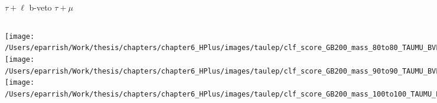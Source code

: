 \documentclass[aspectratio=169,xcolor=table]{beamer}
\begin{document}
    \begin{frame}[t]{$\tau+\ell$ b-veto $\tau+\mu$}
      \begin{columns}[t]
          \texttt{[image: /Users/eparrish/Work/thesis/chapters/chapter6\_HPlus/images/taulep/clf\_score\_GB200\_mass\_80to80\_TAUMU\_BVETO.png]}
          \texttt{[image: /Users/eparrish/Work/thesis/chapters/chapter6\_HPlus/images/taulep/clf\_score\_GB200\_mass\_90to90\_TAUMU\_BVETO.png]}
          \texttt{[image: /Users/eparrish/Work/thesis/chapters/chapter6\_HPlus/images/taulep/clf\_score\_GB200\_mass\_100to100\_TAUMU\_BVETO.png]}

          \texttt{[image: /Users/eparrish/Work/thesis/chapters/chapter6\_HPlus/images/taulep/clf\_score\_GB200\_mass\_110to110\_TAUMU\_BVETO.png]}
          \texttt{[image: /Users/eparrish/Work/thesis/chapters/chapter6\_HPlus/images/taulep/clf\_score\_GB200\_mass\_120to120\_TAUMU\_BVETO.png]}
          \texttt{[image: /Users/eparrish/Work/thesis/chapters/chapter6\_HPlus/images/taulep/clf\_score\_GB200\_mass\_130to130\_TAUMU\_BVETO.png]}
          \texttt{[image: /Users/eparrish/Work/thesis/chapters/chapter6\_HPlus/images/taulep/clf\_score\_GB200\_mass\_140to140\_TAUMU\_BVETO.png]}
          \texttt{[image: /Users/eparrish/Work/thesis/chapters/chapter6\_HPlus/images/taulep/clf\_score\_GB200\_mass\_150to150\_TAUMU\_BVETO.png]}
          \texttt{[image: /Users/eparrish/Work/thesis/chapters/chapter6\_HPlus/images/taulep/clf\_score\_GB200\_mass\_160to160\_TAUMU\_BVETO.png]}

          \texttt{[image: /Users/eparrish/Work/thesis/chapters/chapter6\_HPlus/images/taulep/clf\_score\_GB200\_mass\_170to170\_TAUMU\_BVETO.png]}
          \texttt{[image: /Users/eparrish/Work/thesis/chapters/chapter6\_HPlus/images/taulep/clf\_score\_GB200\_mass\_180to180\_TAUMU\_BVETO.png]}
          \texttt{[image: /Users/eparrish/Work/thesis/chapters/chapter6\_HPlus/images/taulep/clf\_score\_GB200\_mass\_190to190\_TAUMU\_BVETO.png]}

      \end{columns}
    \end{frame}
\end{document}
